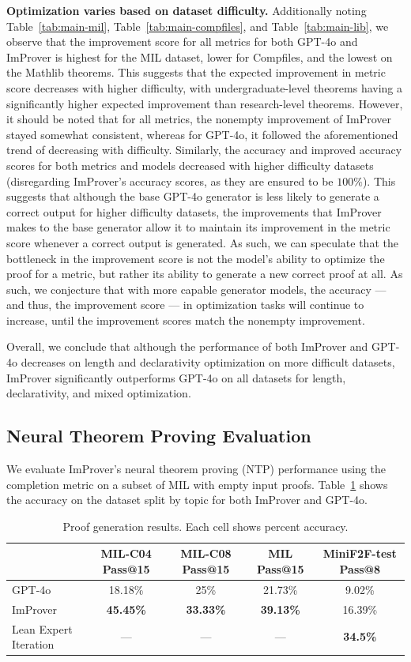 \textbf{Optimization varies based on dataset difficulty.} Additionally noting Table~\ref{tab:main-mil}, Table~\ref{tab:main-compfiles}, and Table~\ref{tab:main-lib}, we observe that the improvement score for all metrics for both GPT-4o and ImProver is highest for the MIL dataset, lower for Compfiles, and the lowest on the Mathlib theorems. This suggests that the expected improvement in metric score decreases with higher difficulty, with undergraduate-level theorems having a significantly higher expected improvement than research-level theorems. However, it should be noted that for all metrics, the nonempty improvement of ImProver stayed somewhat consistent, whereas for GPT-4o, it followed the aforementioned trend of decreasing with difficulty. Similarly, the accuracy and improved accuracy scores for both metrics and models decreased with higher difficulty datasets (disregarding ImProver's accuracy scores, as they are ensured to be $100\%$). This suggests that although the base GPT-4o generator is less likely to generate a correct output for higher difficulty datasets, the improvements that ImProver makes to the base generator allow it to maintain its improvement in the metric score whenever a correct output is generated. As such, we can speculate that the bottleneck in the improvement score is not the model's ability to optimize the proof for a metric, but rather its ability to generate a new correct proof at all. As such, we conjecture that with more capable generator models, the accuracy --- and thus, the improvement score --- in optimization tasks will continue to increase, until the improvement scores match the nonempty improvement.

Overall, we conclude that although the performance of both ImProver and GPT-4o decreases on length and declarativity optimization on more difficult datasets, ImProver significantly outperforms GPT-4o on all datasets for length, declarativity, and mixed optimization.

\subsection{Neural Theorem Proving Evaluation}
\label{ssec:ntp}

We evaluate ImProver's neural theorem proving (NTP) performance using the completion metric on a subset of MIL with empty input proofs. Table~\ref{tab:comp_ntp} shows the accuracy on the dataset split by topic for both ImProver and GPT-4o.

\begin{table}[ht]
\caption{Proof generation results. Each cell shows percent accuracy.}
\label{tab:comp_ntp}
\centering
\small
\begin{tabular}{l|ccc|c}
\toprule
& MIL-C04 Pass@15 & MIL-C08 Pass@15 & MIL Pass@15 & MiniF2F-test Pass@8 \\
\midrule
GPT-4o & 18.18\% & 25\% & 21.73\% & 9.02\% \\
ImProver & \textbf{45.45\%} & \textbf{33.33\%} & \textbf{39.13\%} & 16.39\% \\
Lean Expert Iteration & --- & --- & --- & \textbf{34.5\%} \\
\bottomrule
\end{tabular}
\end{table}

